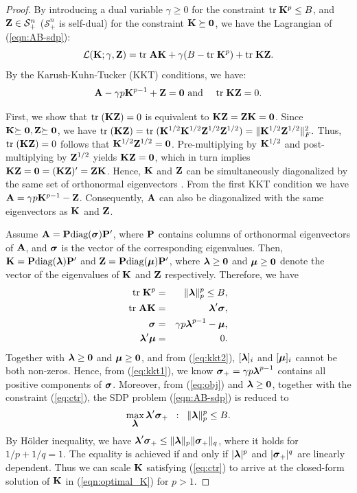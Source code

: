\begin{proof}
By introducing a dual variable $\gamma\geq 0$ for the constraint
$\tr\K^p\leq B$, and $\Z\in\mathcal S_+^n$ ($\mathcal S_+^n$ is
self-dual) for the constraint $\K\succeq \0$, we have the Lagrangian of (\ref{eqn:AB-sdp}):
\begin{equation}
{\cal L}(\K;\gamma,\Z)= \tr \A\K+\gamma(B-\tr\K^p)+\tr\K \Z.\nonumber
\end{equation}
By the Karush-Kuhn-Tucker (KKT) conditions, we have:
\begin{eqnarray}
\A-\gamma p \K^{p-1}+\Z=\0 &\mbox{ and }&
\tr\K \Z=0.\nonumber
\end{eqnarray}

First, we show that $\tr(\K\Z)=0$ is equivalent to $\K\Z=\Z\K=\0$. Since $\K\psd,
\Z\psd$, we have $\tr(\K\Z)=\tr(\K^{1/2}\K^{1/2}\Z^{1/2}\Z^{1/2})
=\|\K^{1/2}\Z^{1/2}\|_F^2.$ Thus, $\tr(\K\Z)=0$ follows that
$\K^{1/2}\Z^{1/2}=\0$. Pre-multiplying by $\K^{1/2}$ and post-multiplying by
$\Z^{1/2}$ yields $\K\Z=\0$, which in turn implies $\K\Z=\0=(\K\Z)'=\Z\K$. Hence,
$\K$ and $\Z$ can be simultaneously diagonalized by the same set of orthonormal
eigenvectors \cite{mp/AlizadehHO97}. From the first KKT condition we have $\A
=\gamma p \K^{p-1} - \Z$. Consequently, $\A$ can also be diagonalized with the
same eigenvectors as $\K$ and $\Z$.

Assume $\A=\P\diag(\bsigma)\P'$, where $\P$ contains columns of
orthonormal eigenvectors of $\A$,  and $\bsigma$ is the vector of the
corresponding eigenvalues. Then, $\K=\P\diag(\blambda)\P'$ and $\Z=\P\diag(\bmu)\P'$, where
$\blambda\geq \0$ and $\bmu \geq \0$ denote the vector of the eigenvalues of $\K$ and $\Z$ respectively. Therefore, we have
\begin{eqnarray}
\tr\K^p &=&\|\blambda\|_p^p\leq B,\label{eq:ctr}\\
\tr \A\K &=&\blambda'\bsigma,\label{eq:obj}\\
\bsigma&=&\gamma p\blambda^{p-1}-\bmu,\label{eq:kkt1}\\
\blambda'\bmu&=&0 \label{eq:kkt2} .
\end{eqnarray}
Together with $\blambda\geq \0$ and $\bmu\geq \0$, and from (\ref{eq:kkt2}),
$[\blambda]_i$ and $[\bmu]_i$ cannot be both non-zeros. Hence, from (\ref{eq:kkt1}), we
know $\bsigma_+=\gamma p\blambda^{p-1}$ contains all positive components of $\bsigma$. Moreover, from  (\ref{eq:obj}) and $\blambda \geq \0$, together with the constraint
(\ref{eq:ctr}), the SDP problem
(\ref{eqn:AB-sdp}) is reduced to
\begin{eqnarray}
\max_{\blambda} \blambda'\bsigma_+ \;\; : \;\; \|\blambda\|_p^p \leq B.\nonumber
\end{eqnarray}
By H\"{o}lder inequality, we have
$\blambda'\bsigma_+ \leq \| \blambda \|_p \| \bsigma_+ \|_q$, where it holds for $1 / p + 1 / q = 1$. The equality is achieved if and only if
$|\blambda|^p$ and $|\bsigma_+|^q$ are linearly dependent. Thus we can scale $\K$ satisfying
(\ref{eq:ctr}) to arrive at the closed-form solution of $\K$ in (\ref{eqn:optimal_K})
for $p>1$.


\end{proof}
